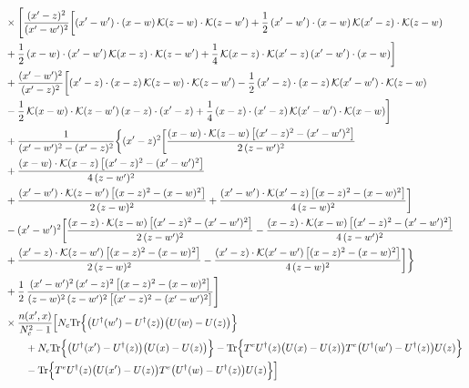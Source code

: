 \documentclass[9pt]{article}
\numberwithin{equation}{section}
\begin{document}
\begin{align}
&\times\Bigg[\frac{(x^{\prime}-z)^{2}}{(x^{\prime}-w^{\prime})^{2}}\bigg[(x^{\prime}-w^{\prime})\cdot(x-w)\,\mathcal{K}(z-w)\cdot\mathcal{K}(z-w^{\prime})+\frac{1}{2}\,(x^{\prime}-w^{\prime})\cdot(x-w)\,\mathcal{K}(x^{\prime}-z)\cdot\mathcal{K}(z-w)\notag \\ & +\frac{1}{2}\,(x-w)\cdot(x^{\prime}-w^{\prime})\,\mathcal{K}(x-z)\cdot\mathcal{K}(z-w^{\prime})+\frac{1}{4}\,\mathcal{K}(x-z)\cdot\mathcal{K}(x^{\prime}-z)\,(x^{\prime}-w^{\prime})\cdot(x-w)\bigg]\notag\\
&+\frac{(x^{\prime}-w^{\prime})^{2}}{(x^{\prime}-z)^{2}}\bigg[(x^{\prime}-z)\cdot(x-z)\,\mathcal{K}(z-w)\cdot\mathcal{K}(z-w^{\prime})-\frac{1}{2}\,(x^{\prime}-z)\cdot(x-z)\,\mathcal{K}(x^{\prime}-w^{\prime})\cdot\mathcal{K}(z-w)\notag \\ & -\frac{1}{2}\,\mathcal{K}(x-w)\cdot\mathcal{K}(z-w^{\prime})\,(x-z)\cdot(x^{\prime}-z)+\frac{1}{4}\,(x-z)\cdot(x^{\prime}-z)\,\mathcal{K}(x^{\prime}-w^{\prime})\cdot\mathcal{K}(x-w)\bigg]\notag\\
&+\frac{1}{(x^{\prime}-w^{\prime})^{2}-(x^{\prime}-z)^{2}}\bigg\{(x^{\prime}-z)^{2}\bigg[\frac{(x-w)\cdot\mathcal{K}(z-w)\,\big[(x^{\prime}-z)^{2}-(x^{\prime}-w^{\prime})^{2}\big]}{2\,(z-w^{\prime})^{2}}\notag\\ &+\frac{(x-w)\cdot\mathcal{K}(x-z)\,\big[(x^{\prime}-z)^{2}-(x^{\prime}-w^{\prime})^{2}\big]}{4\,(z-w^{\prime})^{2}}\notag \\ & +\frac{(x^{\prime}-w^{\prime})\cdot\mathcal{K}(z-w^{\prime})\,\big[(x-z)^{2}-(x-w)^{2}\big]}{2\,(z-w)^{2}}+\frac{(x^{\prime}-w^{\prime})\cdot\mathcal{K}(x^{\prime}-z)\,\big[(x-z)^{2}-(x-w)^{2}\big]}{4\,(z-w)^{2}}\bigg]\notag\\
&-(x^{\prime}-w^{\prime})^{2}\bigg[\frac{(x-z)\cdot\mathcal{K}(z-w)\,\big[(x^{\prime}-z)^{2}-(x^{\prime}-w^{\prime})^{2}\big]}{2\,(z-w^{\prime})^{2}}-\frac{(x-z)\cdot\mathcal{K}(x-w)\,\big[(x^{\prime}-z)^{2}-(x^{\prime}-w^{\prime})^{2}\big]}{4\,(z-w^{\prime})^{2}}\notag \\ & +\frac{(x^{\prime}-z)\cdot\mathcal{K}(z-w^{\prime})\,\big[(x-z)^{2}-(x-w)^{2}\big]}{2\,(z-w)^{2}}-\frac{(x^{\prime}-z)\cdot\mathcal{K}(x^{\prime}-w^{\prime})\,\big[(x-z)^{2}-(x-w)^{2}\big]}{4\,(z-w)^{2}}\bigg]\bigg\}\notag\\
&+\frac{1}{2}\,\frac{(x^{\prime}-w^{\prime})^{2}\,(x^{\prime}-z)^{2}\,\big[(x-z)^{2}-(x-w)^{2}\big]}{(z-w)^{2}\,(z-w^{\prime})^{2}\,\big[(x^{\prime}-z)^{2}-(x^{\prime}-w^{\prime})^{2}\big]}\Bigg]\notag\\ &\times\frac{n(x',x)}{N_{c}^{2}-1}\Big[N_{c}{\rm Tr}\Big\{\big(U^{\dagger}(w')-U^{\dagger}(z)\big)\big(U(w)-U(z)\big)\Big\}\notag\\&\qquad+N_{c}{\rm Tr}\Big\{\big(U^{\dagger}(x')-U^{\dagger}(z)\big)\big(U(x)-U(z)\big)\Big\}-{\rm Tr}\Big\{T^{e}U^{\dagger}(z)\big(U(x)-U(z)\big)T^{e}\big(U^{\dagger}(w')-U^{\dagger}(z)\big)U(z)\Big\}\notag\\&\qquad-{\rm Tr}\Big\{T^{e}U^{\dagger}(z)\big(U(x')-U(z)\big)T^{e}\big(U^{\dagger}(w)-U^{\dagger}(z)\big)U(z)\Big\}\Big]\\

\end{align}
\end{document}
